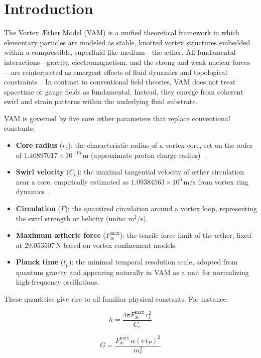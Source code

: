 \documentclass[a4paper,12pt]{article}
\begin{document}
    \newpage
        \section{Introduction}

The Vortex Æther Model (VAM) is a unified theoretical framework in which elementary particles are modeled as stable, knotted vortex structures embedded within a compressible, superfluid-like medium---the \ae ther. All fundamental interactions—gravity, electromagnetism, and the strong and weak nuclear forces—are reinterpreted as emergent effects of fluid dynamics and topological constraints~\cite{VAM4}. In contrast to conventional field theories, VAM does not treat spacetime or gauge fields as fundamental. Instead, they emerge from coherent swirl and strain patterns within the underlying fluid substrate.

VAM is governed by five core æther parameters that replace conventional constants:

\begin{itemize}
    \item \textbf{Core radius} (\(r_c\)): the characteristic radius of a vortex core, set on the order of \(1.40897017 \times 10^{-15}\,\mathrm{m}\) (approximate proton charge radius)~\cite{VAM4}.
    \item \textbf{Swirl velocity} (\(C_e\)): the maximal tangential velocity of æther circulation near a core, empirically estimated as \(1.09384563 \times 10^6\,\mathrm{m/s}\) from vortex ring dynamics~\cite{VAM4}.
    \item \textbf{Circulation} (\(\Gamma\)): the quantized circulation around a vortex loop, representing the swirl strength or helicity (units: \(\mathrm{m}^2/\mathrm{s}\)).
    \item \textbf{Maximum ætheric force} (\( F^{\max}_\text{\ae}\)): the tensile force limit of the æther, fixed at \(29.053507\,\mathrm{N}\) based on vortex confinement models.
    \item \textbf{Planck time} (\(t_p\)): the minimal temporal resolution scale, adopted from quantum gravity and appearing naturally in VAM as a unit for normalizing high-frequency oscillations.
\end{itemize}

\vspace{0.5em}
\noindent These quantities give rise to all familiar physical constants. For instance:

\begin{minipage}{0.48\textwidth}
\begin{equation}
\boxed{
h = \frac{4\pi F^{\max}_\text{\ae}\,r_c^{2}}{C_e}
}
\label{eq:plancks-constants}
\end{equation}
\end{minipage}
\hfill
\begin{minipage}{0.48\textwidth}
\begin{equation}
\boxed{
G = \frac{ F^{\max}_\text{\ae}\,\alpha(c\,t_P)^2}{m_e^2}
}
\label{eq:newtons-constants}
\end{equation}
\end{minipage}
\end{document}
